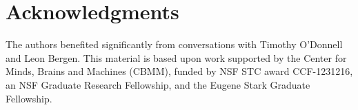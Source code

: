 \documentclass[10pt,letterpaper]{article}
\begin{document}
\section{Acknowledgments}

The authors benefited significantly from conversations with Timothy
O'Donnell and Leon Bergen. This material is based upon work supported
by the Center for Minds, Brains and Machines (CBMM), funded by NSF STC
award CCF-1231216, an NSF Graduate Research Fellowship, and the Eugene
Stark Graduate Fellowship.




\setlength{\bibleftmargin}{.125in}
\setlength{\bibindent}{-\bibleftmargin}

\end{document}

